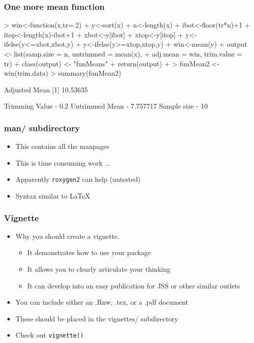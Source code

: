 \documentclass[xcolor=svgnames]{beamer}
\begin{document}
\begin{frame}[fragile]
\frametitle{One more mean function}
\begin{scriptsize}
\begin{Schunk}
\begin{Sinput}
> win<-function(x,tr=.2){
+    y<-sort(x)
+    n<-length(x)
+    ibot<-floor(tr*n)+1
+    itop<-length(x)-ibot+1
+    xbot<-y[ibot]
+    xtop<-y[itop]
+    y<-ifelse(y<=xbot,xbot,y)
+    y<-ifelse(y>=xtop,xtop,y)
+    win<-mean(y)
+    output <- list(samp.size = n, untrimmed = mean(x),
+                   adj.mean = win, trim.value = tr)
+     class(output) <- "funMeans"
+     return(output)
+ }
> funMean2 <- win(trim.data)
> summary(funMean2)
\end{Sinput}
\begin{Soutput}
 Adjusted Mean
[1] 10.53635

 Trimming Value -  0.2
 Untrimmed Mean -  7.757717
 Sample size -  10 
\end{Soutput}
\end{Schunk}
\end{scriptsize}
\end{frame}

\begin{frame}
  \frametitle{man/ subdirectory}
  \begin{itemize}
  \item This contains all the manpages
  \item This is time consuming work ... 
    \item Apparently \texttt{roxygen2} can help (untested)
      \item Syntax similar to \LaTeX
  \end{itemize}
  
\end{frame}

\begin{frame}
  \frametitle{Vignette}
  \begin{itemize}
  \item Why you should create a vignette.
    \begin{itemize}
    \item It demonstrates how to use your package
    \item It allows you to clearly articulate your thinking
    \item It can develop into an easy publication for JSS or other similar outlets

    \end{itemize}
  \item You can include either an .Rnw, .tex, or a .pdf document
  \item These should be placed in the vignettes/ subdirectory
        \item Check out \texttt{vignette()}
  \end{itemize}
\end{frame}
\end{document}
